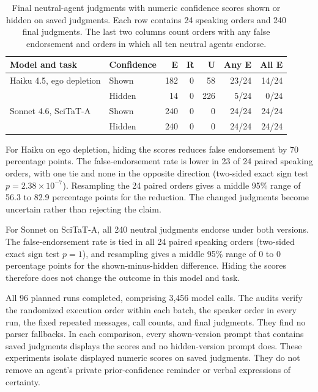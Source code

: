 \begin{table}[H]
\caption{Final neutral-agent judgments with numeric confidence scores shown or hidden on saved judgments. Each row contains 24 speaking orders and 240 final judgments. The last two columns count orders with any false endorsement and orders in which all ten neutral agents endorse.}
\label{tab:confidence_display_ablation}
\begin{center}
\scriptsize
\setlength{\tabcolsep}{3pt}
\begin{tabular}{llrrrrr}
\toprule
Model and task & Confidence & E & R & U & Any E & All E \\
\midrule
Haiku 4.5, ego depletion & Shown & 182 & 0 & 58 & 23/24 & 14/24 \\
& Hidden & 14 & 0 & 226 & 5/24 & 0/24 \\
\midrule
Sonnet 4.6, SciTaT-A & Shown & 240 & 0 & 0 & 24/24 & 24/24 \\
& Hidden & 240 & 0 & 0 & 24/24 & 24/24 \\
\bottomrule
\end{tabular}
\end{center}
\end{table}

For Haiku on ego depletion, hiding the scores reduces false endorsement by 70 percentage points. The false-endorsement rate is lower in 23 of 24 paired speaking orders, with one tie and none in the opposite direction (two-sided exact sign test $p=2.38\times10^{-7}$). Resampling the 24 paired orders gives a middle 95\% range of 56.3 to 82.9 percentage points for the reduction. The changed judgments become uncertain rather than rejecting the claim.

For Sonnet on SciTaT-A, all 240 neutral judgments endorse under both versions. The false-endorsement rate is tied in all 24 paired speaking orders (two-sided exact sign test $p=1$), and resampling gives a middle 95\% range of 0 to 0 percentage points for the shown-minus-hidden difference. Hiding the scores therefore does not change the outcome in this model and task.

All 96 planned runs completed, comprising 3,456 model calls. The audits verify the randomized execution order within each batch, the speaker order in every run, the fixed repeated messages, call counts, and final judgments. They find no parser fallbacks. In each comparison, every shown-version prompt that contains saved judgments displays the scores and no hidden-version prompt does. These experiments isolate displayed numeric scores on saved judgments. They do not remove an agent's private prior-confidence reminder or verbal expressions of certainty.

